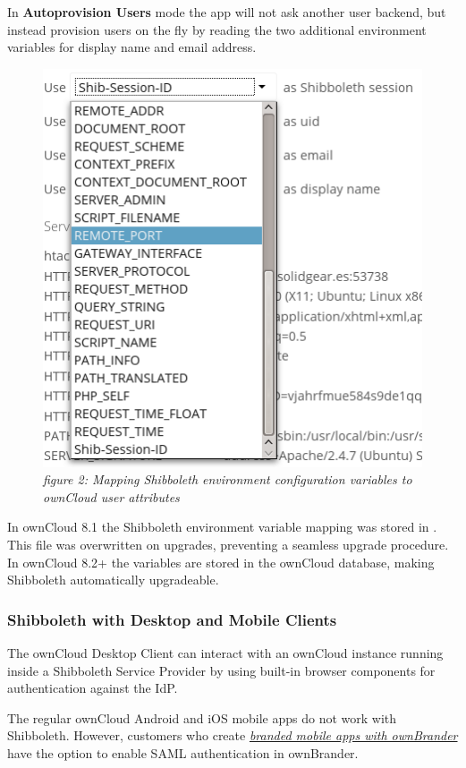 \documentclass[letterpaper,10pt,english]{sphinxmanual}
\begin{document}
In \textbf{Autoprovision Users} mode the app will not ask another user backend, but
instead provision users on the fly by reading the two additional environment
variables for display name and email address.
\begin{figure}[htbp]
\centering
\capstart

\includegraphics{shib-gui6.png}
\caption{\emph{figure 2: Mapping Shibboleth environment configuration variables to ownCloud
user attributes}}\end{figure}

In ownCloud 8.1 the Shibboleth environment variable mapping was stored in
. This file was overwritten on upgrades,
preventing a seamless upgrade procedure. In ownCloud 8.2+ the variables are
stored in the ownCloud database, making Shibboleth automatically upgradeable.


\subsubsection{Shibboleth with Desktop and Mobile Clients}
\label{enterprise_user_management/user_auth_shibboleth:shibboleth-with-desktop-and-mobile-clients}
The ownCloud Desktop Client can interact with an
ownCloud instance running inside a Shibboleth Service Provider by using built-in
browser components for authentication against the IdP.

The regular ownCloud Android and iOS mobile apps do not work with Shibboleth.
However, customers who create
{\hyperref[enterprise_clients/creating_branded_apps::doc]{\emph{branded mobile apps with ownBrander}}}
have the option to enable SAML authentication in ownBrander.
\end{document}
